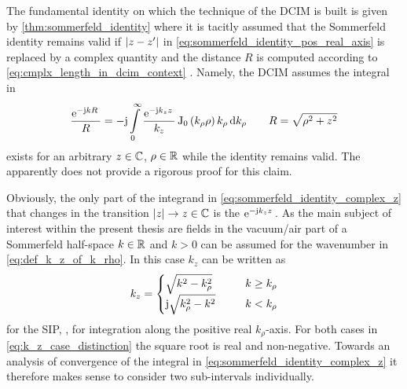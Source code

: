 The fundamental identity on which the technique of the \ac{DCIM} is built is
given by \cref{thm:sommerfeld_identity} where it is tacitly
assumed that the Sommerfeld identity remains valid if $\left\vert z-z^\prime\right\vert$ in
\eqref{eq:sommerfeld_identity_pos_real_axis} is replaced by a complex quantity
and the distance $R$ is computed according to
\eqref{eq:cmplx_length_in_dcim_context} \cite{Fang1988}.
Namely, the \ac{DCIM} assumes the integral in
\begin{equation}\label{eq:sommerfeld_identity_complex_z}
	\frac{\mathrm{e}^{-\mathrm{j} k R}\,}{R} = 
	-\mathrm{j}
	\int\limits_{0}^{\infty} 
	\frac{\mathrm{e}^{-\mathrm{j} k_z z}\,}{k_z}
	\operatorname{J}_{0} \left(k_\rho \rho\right)
	k_\rho 
	\,
	\mathrm{d} k_\rho
	\qquad
	R = \sqrt{\rho^2 + z^2}
\end{equation}
exists for an arbitrary $z \in \mathbb{C}$, $\rho \in \mathbb{R}$ while the identity remains
valid.
The apparently does not provide a rigorous proof for this claim.

Obviously, the only part of the integrand in
\eqref{eq:sommerfeld_identity_complex_z} that changes in the transition
$\left\vert z\right\vert \to z \in \mathbb{C}$ is the $\mathrm{e}^{-\mathrm{j} k_z z}\,$.
As the main subject of interest within the present thesis are fields in the
vacuum/air part of a Sommerfeld half-space $k \in \mathbb{R}$ and $k > 0$ can be
assumed for the wavenumber in \eqref{eq:def_k_z_of_k_rho}.
In this case $k_z$ can be written as
\begin{equation}\label{eq:k_z_case_distinction}
	k_z =
	\begin{cases}
		\sqrt{k^2 - k_\rho^2}
		\qquad
		&k \geq k_\rho
		\\
		\mathrm{j}
		\sqrt{k_\rho^2 - k^2}
		&k < k_\rho
	\end{cases}
\end{equation}
for the \ac{SIP}, \ie, for integration along the positive real $k_\rho$-axis.
For both cases in \eqref{eq:k_z_case_distinction} the square root is real and 
non-negative.
Towards an analysis of convergence of the integral in
\eqref{eq:sommerfeld_identity_complex_z} it therefore makes sense to consider
two sub-intervals individually.

